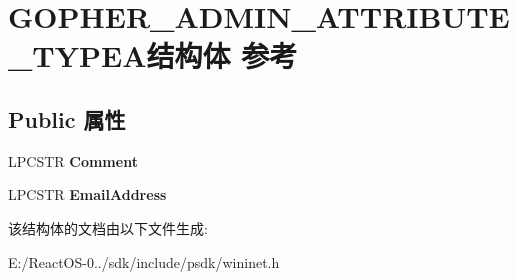 \hypertarget{struct_g_o_p_h_e_r___a_d_m_i_n___a_t_t_r_i_b_u_t_e___t_y_p_e_a}{}\section{G\+O\+P\+H\+E\+R\+\_\+\+A\+D\+M\+I\+N\+\_\+\+A\+T\+T\+R\+I\+B\+U\+T\+E\+\_\+\+T\+Y\+P\+E\+A结构体 参考}
\label{struct_g_o_p_h_e_r___a_d_m_i_n___a_t_t_r_i_b_u_t_e___t_y_p_e_a}
\subsection*{Public 属性}
\begin{DoxyCompactItemize}
\item 
\mbox{\label{struct_g_o_p_h_e_r___a_d_m_i_n___a_t_t_r_i_b_u_t_e___t_y_p_e_a_a487e2c29f62cbd114a2718ce02406b71}} 
L\+P\+C\+S\+TR {\bfseries Comment}
\item 
\mbox{\label{struct_g_o_p_h_e_r___a_d_m_i_n___a_t_t_r_i_b_u_t_e___t_y_p_e_a_a265a93c7bbaa5b1830c86d58bf2f783d}} 
L\+P\+C\+S\+TR {\bfseries Email\+Address}
\end{DoxyCompactItemize}


该结构体的文档由以下文件生成\+:\begin{DoxyCompactItemize}
\item 
E\+:/\+React\+O\+S-\/0../sdk/include/psdk/wininet.\+h\end{DoxyCompactItemize}
